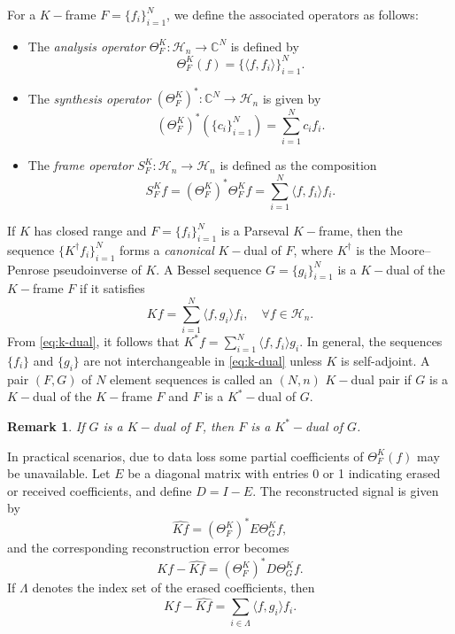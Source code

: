 \documentclass[final,1p,times]{elsarticle}
\newtheorem{rem}[thm]{Remark}
\begin{document}
For a \( K-\)frame \( F = \{f_i\}_{i=1}^N \), we define the associated operators as follows:
\begin{itemize}
  \item The \textit{analysis operator} \( \Theta_F^K : \mathcal{H}_n \to \mathbb{C}^N \) is defined by
  \[ \Theta_F^K(f) = \{\langle f, f_i \rangle\}_{i=1}^N. \]

  \item The \textit{synthesis operator} \( (\Theta_F^K)^* : \mathbb{C}^N \to \mathcal{H}_n \) is given by
  \[ (\Theta_F^K)^*(\{c_i\}_{i=1}^N) = \sum_{i=1}^N c_i f_i. \]

  \item The \textit{frame operator} \( S_F^K : \mathcal{H}_n \to \mathcal{H}_n \) is defined as the composition
  \[ S_F^K f = (\Theta_F^K)^* \Theta_F^K f = \sum_{i=1}^N \langle f, f_i \rangle f_i. \]
\end{itemize}

If \( K \) has closed range and \( F = \{f_i\}_{i=1}^N \) is a Parseval \( K-\)frame, then the sequence \( \{K^\dag f_i\}_{i=1}^N \) forms a \textit{canonical} \( K-\)dual of \( F \), where \( K^\dag \) is the Moore--Penrose pseudoinverse of \( K \). A Bessel sequence \( G = \{g_i\}_{i=1}^N \) is a \( K-\)dual of the \( K-\)frame \( F \) if it satisfies
\begin{equation}\label{eq:k-dual}
Kf = \sum_{i=1}^N \langle f, g_i \rangle f_i, \quad \forall f \in \mathcal{H}_n.
\end{equation}
From \eqref{eq:k-dual}, it follows that \( K^*f = \sum_{i=1}^N \langle f, f_i \rangle g_i. \) In general, the sequences \( \{f_i\} \) and \( \{g_i\} \) are not interchangeable in \eqref{eq:k-dual} unless \( K \) is self-adjoint. A pair \( (F, G) \) of \( N \) element sequences is called an \( (N, n) \) \( K -\)dual pair if \( G \) is a \( K-\)dual of the $K-$frame \( F \) and \( F \) is a \( K^* -\)dual of \( G \).
\begin{rem}
If \( G \) is a \( K-\)dual of \( F \), then \( F \) is a \( K^*-\)dual of \( G \).
\end{rem}
\noindent In practical scenarios, due to data loss some partial coefficients of \( \Theta_F^K(f) \) may be unavailable. Let \( E \) be a diagonal matrix with entries 0 or 1 indicating erased or received coefficients, and define \( D = I - E \). The reconstructed signal is given by
\[
\widehat{Kf} = (\Theta_F^K)^* E \Theta_G^K f,
\]
and the corresponding reconstruction error becomes
\[
Kf - \widehat{Kf} = (\Theta_F^K)^* D \Theta_G^K f.
\]
If \( \Lambda \) denotes the index set of the erased coefficients, then
\[ Kf - \widehat{Kf} = \sum_{i \in \Lambda} \langle f, g_i \rangle f_i. \]
\end{document}
